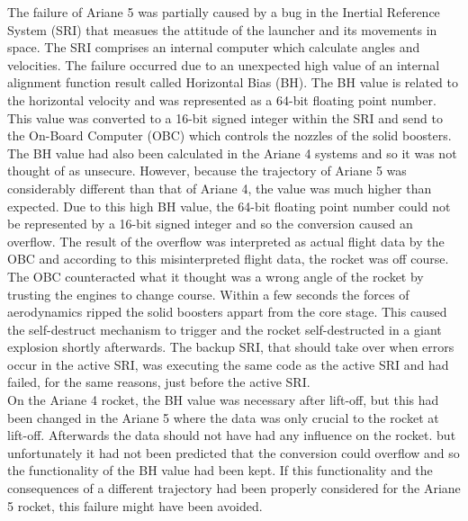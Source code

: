 The failure of Ariane 5 was partially caused by a bug in the Inertial Reference System (SRI) that measues the attitude of the launcher and its movements in space. The SRI comprises an internal computer which calculate angles and velocities.
The failure occurred due to an unexpected high value of an internal alignment function result called Horizontal Bias (BH). The BH value is related to the horizontal velocity and was represented as a 64-bit floating point number. This value was converted to a 16-bit signed integer within the SRI and send to the On-Board Computer (OBC) which controls the nozzles of the solid boosters.\\

The BH value had also been calculated in the Ariane 4 systems and so it was not thought of as unsecure. However, because the trajectory of Ariane 5 was considerably different than that of Ariane 4, the value was much higher than expected. Due to this high BH value, the 64-bit floating point number could not be represented by a 16-bit signed integer and so the conversion caused an overflow.
The result of the overflow was interpreted as actual flight data by the OBC and according to this misinterpreted flight data, the rocket was off course. The OBC counteracted what it thought was a wrong angle of the rocket by trusting the engines to change course. Within a few seconds the forces of aerodynamics ripped the solid boosters appart from the core stage. This caused the self-destruct mechanism to trigger and the rocket self-destructed in a giant explosion shortly afterwards. The backup SRI, that should take over when errors occur in the active SRI, was executing the same code as the active SRI and had failed, for the same reasons, just before the active SRI.\\

On the Ariane 4 rocket, the BH value was necessary after lift-off, but this had been changed in the Ariane 5 where the data was only crucial to the rocket at lift-off. Afterwards the data should not have had any influence on the rocket. but unfortunately it had not been predicted that the conversion could overflow and so the functionality of the BH value had been kept. If this functionality and the consequences of a different trajectory had been properly considered for the Ariane 5 rocket, this failure might have been avoided.

